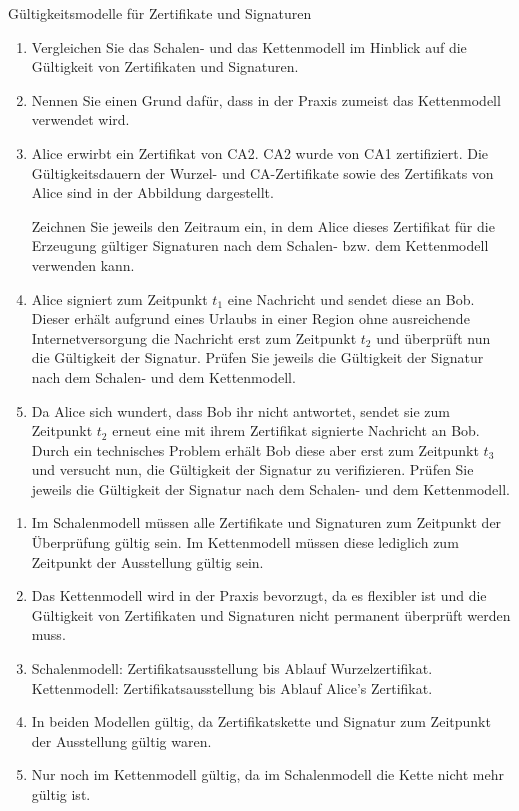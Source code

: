 \documentclass{article}
\begin{document}
\begin{exercise}{Gültigkeitsmodelle für Zertifikate und Signaturen}
  \begin{enumerate}
    \item Vergleichen Sie das Schalen- und das Kettenmodell im Hinblick auf die Gültigkeit von Zertifikaten und Signaturen.
    \item Nennen Sie einen Grund dafür, dass in der Praxis zumeist das Kettenmodell verwendet wird.
    \item Alice erwirbt ein Zertifikat von CA2. CA2 wurde von CA1 zertifiziert. Die Gültigkeitsdauern der Wurzel- und CA-Zertifikate sowie des Zertifikats von Alice sind in der Abbildung dargestellt.
      
      Zeichnen Sie jeweils den Zeitraum ein, in dem Alice dieses Zertifikat für die Erzeugung gültiger Signaturen nach dem Schalen- bzw. dem Kettenmodell verwenden kann.
    \item Alice signiert zum Zeitpunkt $t_1$ eine Nachricht und sendet diese an Bob. Dieser erhält aufgrund eines Urlaubs in einer Region ohne ausreichende Internetversorgung die Nachricht erst zum Zeitpunkt $t_2$ und überprüft nun die Gültigkeit der Signatur. Prüfen Sie jeweils die Gültigkeit der Signatur nach dem Schalen- und dem Kettenmodell.
    \item Da Alice sich wundert, dass Bob ihr nicht antwortet, sendet sie zum Zeitpunkt $t_2$ erneut eine mit ihrem Zertifikat signierte Nachricht an Bob. Durch ein technisches Problem erhält Bob diese aber erst zum Zeitpunkt $t_3$ und versucht nun, die Gültigkeit der Signatur zu verifizieren. Prüfen Sie jeweils die Gültigkeit der Signatur nach dem Schalen- und dem Kettenmodell.
  \end{enumerate}

  \begin{solution}
    \begin{enumerate}
      \item Im Schalenmodell müssen alle Zertifikate und Signaturen zum Zeitpunkt der Überprüfung gültig sein. Im Kettenmodell müssen diese lediglich zum Zeitpunkt der Ausstellung gültig sein.
      \item Das Kettenmodell wird in der Praxis bevorzugt, da es flexibler ist und die Gültigkeit von Zertifikaten und Signaturen nicht permanent überprüft werden muss.
      \item Schalenmodell: Zertifikatsausstellung bis Ablauf Wurzelzertifikat. Kettenmodell: Zertifikatsausstellung bis Ablauf Alice's Zertifikat.
      \item In beiden Modellen gültig, da Zertifikatskette und Signatur zum Zeitpunkt der Ausstellung gültig waren.
      \item Nur noch im Kettenmodell gültig, da im Schalenmodell die Kette nicht mehr gültig ist.
    \end{enumerate}
  \end{solution}
\end{exercise}
\end{document}
